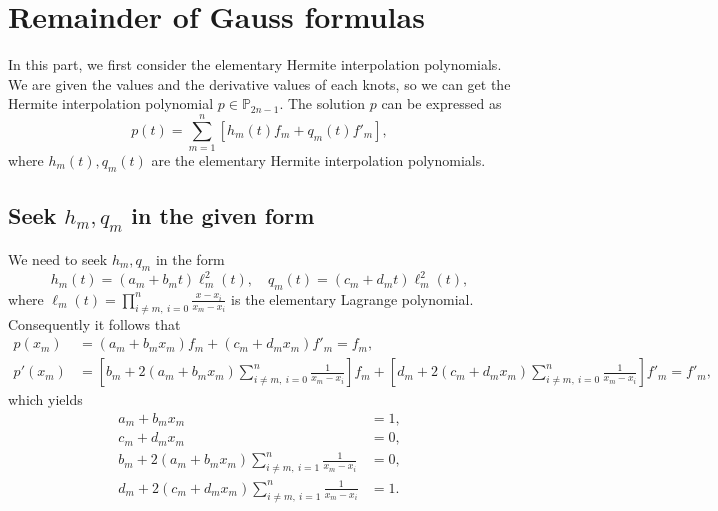 \documentclass[a4paper]{article}
\begin{document}
\section{Remainder of Gauss formulas}

In this part, we first consider the elementary Hermite interpolation polynomials. We are given the values and the derivative values of each knots, so we can get the Hermite interpolation polynomial $p \in \mathbb{P}_{2n - 1}$. 
The solution $p$ can be expressed as 
\begin{equation}
    p(t) = \sum_{m = 1}^n [h_m(t)f_m + q_m(t)f'_m],
    \label{eq:4_hermite_interpolation}
\end{equation}
where $h_m(t), q_m(t)$ are the elementary Hermite interpolation polynomials.

\subsection{Seek $h_m, q_m$ in the given form}

We need to seek $h_m, q_m$ in the form
\begin{equation}
    h_m(t) = (a_m + b_mt) \ell^2_m(t), \quad q_m(t) = (c_m + d_mt) \ell^2_m(t),
    \label{eq:4_hermite_interpolation_form}
\end{equation}
where $\ell_m(t) = \prod_{i \ne m,\ i = 0}^n \frac{x - x_i}{x_m - x_i}$ is the elementary Lagrange polynomial.
Consequently it follows that
\begin{equation}
    \begin{aligned}
        p(x_m) &= (a_m + b_m x_m)f_m + (c_m + d_m x_m)f'_m = f_m, \\
        p'(x_m) &= [b_m + 2(a_m + b_m x_m)\sum_{i \ne m,\ i = 0}^n \frac{1}{x_m - x_i}]f_m + [d_m + 2(c_m + d_m x_m)\sum_{i \ne m,\ i = 0}^n \frac{1}{x_m - x_i}]f'_m = f'_m,
    \end{aligned}
    \label{eq:4_hermite_interpolation_form_values}
\end{equation}
which yields
\begin{equation}
    \begin{aligned}
        a_m + b_m x_m &= 1, \\
        c_m + d_m x_m &= 0, \\ 
        b_m + 2(a_m + b_m x_m)\sum_{i \ne m,\ i = 1}^n \frac{1}{x_m - x_i} &= 0, \\
        d_m + 2(c_m + d_m x_m)\sum_{i \ne m,\ i = 1}^n \frac{1}{x_m - x_i} &= 1.
    \end{aligned}
    \label{eq:4_hermite_interpolation_form_values_final}
\end{equation}
\end{document}
